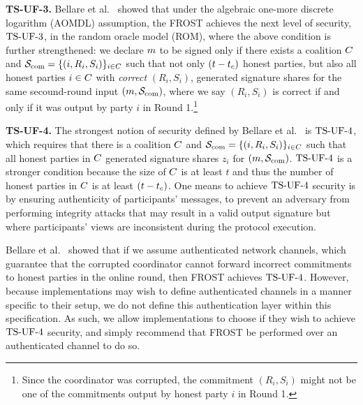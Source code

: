 \medskip

\textbf{TS-UF-3.} Bellare et al.~\cite{BellareCKMTZ22} showed that under the algebraic one-more discrete logarithm (AOMDL) assumption, the FROST achieves the next level of security, $\mathrm{TS}\mbox{-}\mathrm{UF}\mbox{-}{3}$, in the random oracle model (ROM), where the above condition is further strengthened:
we declare $m$ to be signed only if there exists  a coalition $C$ and $\mathcal{S}_{\rm com}=\{ (i, R_{i}, S_{i})\}_{i \in C}$ such that not only  $(t - t_c)$ honest parties, but also all honest parties $i\in C$ with \emph{correct} $(R_{i}, S_{i})$, generated signature shares  for the same secound-round input $(m, \mathcal{S}_{\rm com})$, where we say $(R_{i}, S_{i})$ is correct if and only if it was output by party $i$ in Round 1.\footnote{Since the coordinator was corrupted, the commitment $(R_{i}, S_{i})$ might not be one of the commitments output by honest party $i$ in Round 1.}


\medskip

\textbf{TS-UF-4.}
The strongest notion of security defined by Bellare et al.~\cite{BellareCKMTZ22} is $\mathrm{TS}\mbox{-}\mathrm{UF}\mbox{-}{4}$,
which requires that there is a coalition $C$ and $\mathcal{S}_{\rm com}=\{ (i, R_{i}, S_{i})\}_{i \in C}$ such that all honest parties in $C$ generated  signature shares  $z_i$ for $(m, \mathcal{S}_{\rm com})$.
$\mathrm{TS}\mbox{-}\mathrm{UF}\mbox{-}{4}$ is a stronger condition because the size of $C$ is at least $t$ and thus the number of honest parties in $C$ is at least  $(t - t_c)$.
One means to achieve $\mathrm{TS}\mbox{-}\mathrm{UF}\mbox{-}{4}$ security is by ensuring authenticity of participants' messages,
to prevent an adversary from performing integrity attacks that may result in a valid output signature but where participants' views are inconsistent during the protocol execution.

Bellare et al.~\cite{BellareCKMTZ22} showed that if we assume authenticated network channels, which guarantee that the corrupted coordinator cannot forward incorrect commitments to honest parties in the online round,
then FROST achieves $\mathrm{TS}\mbox{-}\mathrm{UF}\mbox{-}{4}$.
However, because implementations may wish to define authenticated channels in a manner specific to their setup,
we do not define this authentication layer within this specification.
As such,
we allow implementations to choose if they wish to achieve $\mathrm{TS}\mbox{-}\mathrm{UF}\mbox{-}{4}$ security,
and simply recommend that FROST be performed over an authenticated channel to do so.

